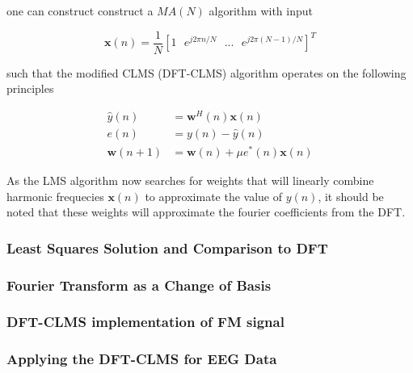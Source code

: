\documentclass[main.tex]{subfiles}
\begin{document}
one can construct construct a $MA(N)$ algorithm with input 

\begin{equation}
\textbf{x}(n) = \frac{1}{N}\left[1\ \ \ e^{j2\pi n/N}\ \ \ ...\ \ \ e^{j2\pi (N-1)/N}\right]^T
\end{equation}


such that the modified CLMS (DFT-CLMS) algorithm operates on the following principles

\begin{align*}
\hat{y}(n) &= \textbf{w}^H(n)\textbf{x}(n)\\
e(n) &= y(n) - \hat{y}(n)\\
\textbf{w}(n+1) &= \textbf{w}(n) + \mu e^*(n)\textbf{x}(n)
\end{align*}


As the LMS algorithm now searches for weights that will linearly combine harmonic frequecies $\textbf{x}(n)$ to approximate the value of $y(n)$, it should be noted that these weights will approximate the fourier coefficients from the DFT. 

\subsubsection{Least Squares Solution and Comparison to DFT}

\subsubsection{Fourier Transform as a Change of Basis}

\subsubsection{DFT-CLMS implementation of FM signal}

\subsubsection{Applying the DFT-CLMS for EEG Data}
\end{document}
